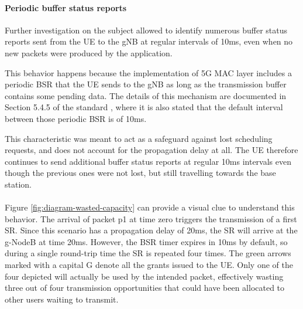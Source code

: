 \paragraph{Periodic buffer status reports} Further investigation on the subject allowed to identify numerous buffer status reports sent from the \ac{UE} to the \ac{gNB} at regular intervals of 10ms, even when no new packets were produced by the application.

This behavior happens because the implementation of 5G \ac{MAC} layer includes a periodic \ac{BSR} that the \ac{UE} sends to the \ac{gNB} as long as the transmission buffer contains some pending data.
The details of this mechanism are documented in Section 5.4.5 of the standard \cite{etsi-mac-specification}, where it is also stated that the default interval between those periodic \ac{BSR} is of 10ms.

This characteristic was meant to act as a safeguard against lost scheduling requests, and does not account for the propagation delay at all. The \ac{UE} therefore continues to send additional buffer status reports at regular 10ms intervals even though the previous ones were not lost, but still travelling towards the base station.

\paragraph{}
Figure \ref{fig:diagram-wasted-capacity} can provide a visual clue to understand this behavior. The arrival of packet p1 at time zero triggers the transmission of a first \ac{SR}. Since this scenario has a propagation delay of 20ms, the \ac{SR} will arrive at the g-NodeB at time 20ms. However, the \ac{BSR} timer expires in 10ms by default, so during a single round-trip time the \ac{SR} is repeated four times. The green arrows marked with a capital G denote all the grants issued to the \ac{UE}. Only one of the four depicted will actually be used by the intended packet, effectively wasting three out of four transmission opportunities that could have been allocated to other users waiting to transmit.

